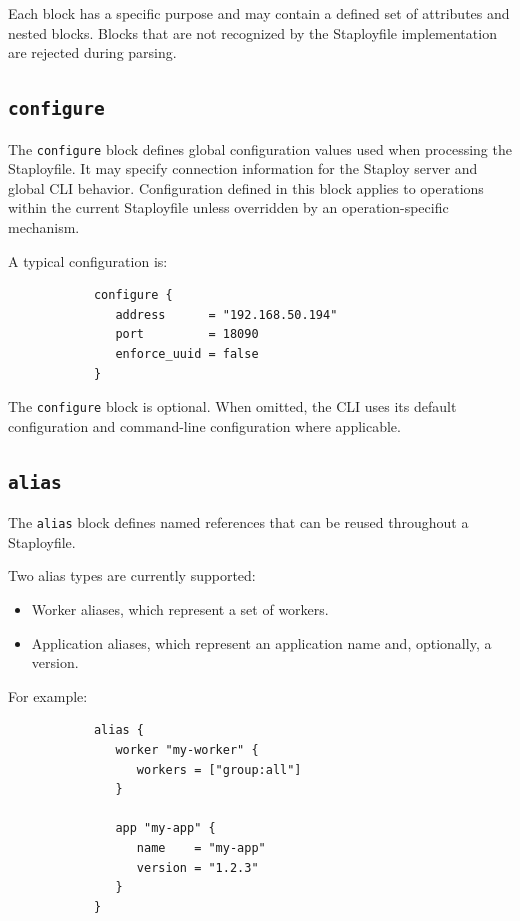 \documentclass[11pt,a4paper]{article}
\begin{document}
    Each block has a specific purpose and may contain a defined set of attributes and nested blocks.
    Blocks that are not recognized by the Staployfile implementation are rejected during parsing.

    \subsection{\texttt{configure}}\label{subsec:texttt{configure}}

    The \texttt{configure} block defines global configuration values used when processing the Staployfile.
    It may specify connection information for the Staploy server and global CLI behavior.
    Configuration defined in this block applies to operations within the current Staployfile unless overridden by an operation-specific mechanism.

    A typical configuration is:

    \begin{center}
        \begin{verbatim}
            configure {
               address      = "192.168.50.194"
               port         = 18090
               enforce_uuid = false
            }
        \end{verbatim}
    \end{center}

    The \texttt{configure} block is optional.
    When omitted, the CLI uses its default configuration and command-line configuration where applicable.

    \subsection{\texttt{alias}}\label{subsec:texttt{alias}}

    The \texttt{alias} block defines named references that can be reused
    throughout a Staployfile.

    Two alias types are currently supported:

    \begin{itemize}
        \item Worker aliases, which represent a set of workers.
        \item Application aliases, which represent an application name and,
        optionally, a version.
    \end{itemize}

    For example:

    \begin{center}
        \begin{verbatim}
            alias {
               worker "my-worker" {
                  workers = ["group:all"]
               }

               app "my-app" {
                  name    = "my-app"
                  version = "1.2.3"
               }
            }
        \end{verbatim}

    \end{center}
\end{document}
